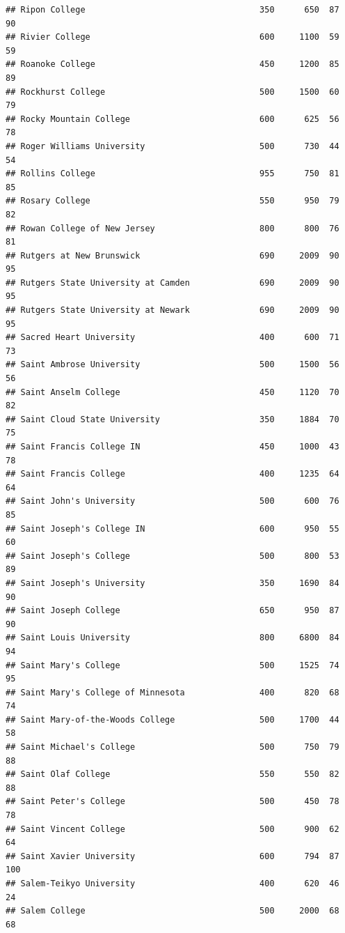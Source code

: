 \documentclass[
]{article}
\begin{document}
\begin{verbatim}
## Ripon College                                   350      650  87       90
## Rivier College                                  600     1100  59       59
## Roanoke College                                 450     1200  85       89
## Rockhurst College                               500     1500  60       79
## Rocky Mountain College                          600      625  56       78
## Roger Williams University                       500      730  44       54
## Rollins College                                 955      750  81       85
## Rosary College                                  550      950  79       82
## Rowan College of New Jersey                     800      800  76       81
## Rutgers at New Brunswick                        690     2009  90       95
## Rutgers State University at Camden              690     2009  90       95
## Rutgers State University at Newark              690     2009  90       95
## Sacred Heart University                         400      600  71       73
## Saint Ambrose University                        500     1500  56       56
## Saint Anselm College                            450     1120  70       82
## Saint Cloud State University                    350     1884  70       75
## Saint Francis College IN                        450     1000  43       78
## Saint Francis College                           400     1235  64       64
## Saint John's University                         500      600  76       85
## Saint Joseph's College IN                       600      950  55       60
## Saint Joseph's College                          500      800  53       89
## Saint Joseph's University                       350     1690  84       90
## Saint Joseph College                            650      950  87       90
## Saint Louis University                          800     6800  84       94
## Saint Mary's College                            500     1525  74       95
## Saint Mary's College of Minnesota               400      820  68       74
## Saint Mary-of-the-Woods College                 500     1700  44       58
## Saint Michael's College                         500      750  79       88
## Saint Olaf College                              550      550  82       88
## Saint Peter's College                           500      450  78       78
## Saint Vincent College                           500      900  62       64
## Saint Xavier University                         600      794  87      100
## Salem-Teikyo University                         400      620  46       24
## Salem College                                   500     2000  68       68

\end{verbatim}
\end{document}
